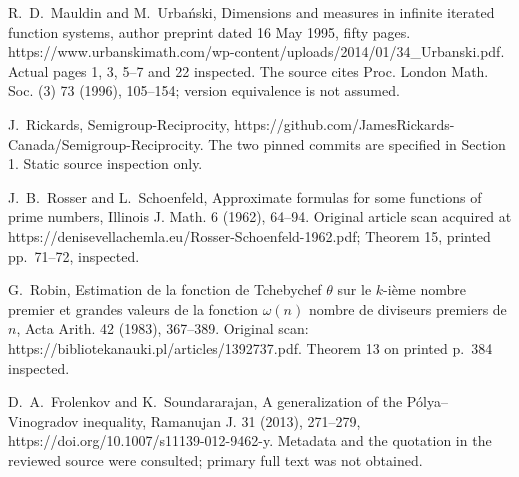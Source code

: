 \documentclass[10pt]{article}
\begin{document}
R. D. Mauldin and M. Urbański, Dimensions and measures in infinite iterated function systems, author preprint dated 16 May 1995, fifty pages. https://www.urbanskimath.com/wp-content/uploads/2014/01/34\_Urbanski.pdf. Actual pages 1, 3, 5–7 and 22 inspected. The source cites Proc. London Math. Soc. (3) 73 (1996), 105–154; version equivalence is not assumed.\par
J. Rickards, Semigroup-Reciprocity, https://github.com/JamesRickards-Canada/Semigroup-Reciprocity. The two pinned commits are specified in Section 1. Static source inspection only.\par
J. B. Rosser and L. Schoenfeld, Approximate formulas for some functions of prime numbers, Illinois J. Math. 6 (1962), 64–94. Original article scan acquired at https://denisevellachemla.eu/Rosser-Schoenfeld-1962.pdf; Theorem 15, printed pp. 71–72, inspected.\par
G. Robin, Estimation de la fonction de Tchebychef \(\theta\) sur le \(k\)-ième nombre premier et grandes valeurs de la fonction \(\omega(n)\) nombre de diviseurs premiers de \(n\), Acta Arith. 42 (1983), 367–389. Original scan: https://bibliotekanauki.pl/articles/1392737.pdf. Theorem 13 on printed p. 384 inspected.\par
D. A. Frolenkov and K. Soundararajan, A generalization of the Pólya–Vinogradov inequality, Ramanujan J. 31 (2013), 271–279, https://doi.org/10.1007/s11139-012-9462-y. Metadata and the quotation in the reviewed source were consulted; primary full text was not obtained.\par
\end{document}

